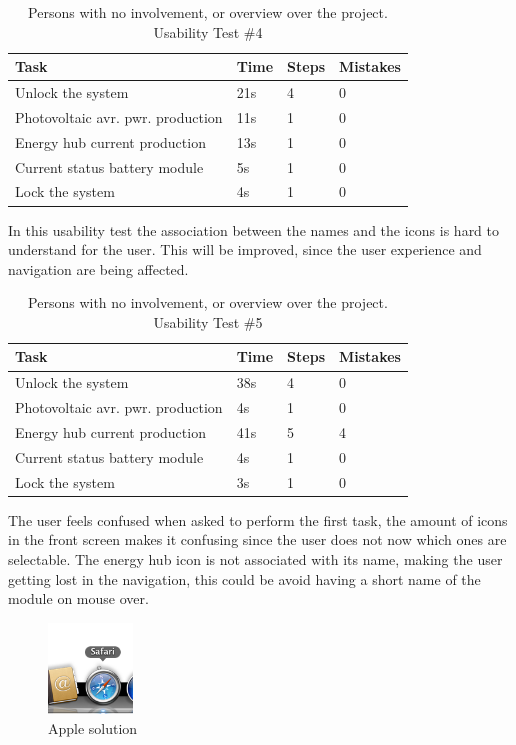 \begin{table}[H]
\begin{tabular}{ | l | l | l | l |}
	\hline
	Task 					     &		Time 	& 	Steps 	& 	Mistakes 		\\ \hline
	Unlock the system 			     & 		21s		& 	4		& 	0			\\ \hline
	Photovoltaic avr. pwr. production  & 		11s		&	1		& 	0			\\ \hline
	Energy hub current production      & 		13s		& 	1		& 	0			\\ \hline
	Current status battery module 	     & 		5s		& 	1		& 	0			\\ \hline
	Lock the system 			     & 		4s		& 	1		& 	0			\\ \hline
\end{tabular}
\caption{Persons with no involvement, or overview over the project.  Usability Test \#4}
\end{table}
In this usability test the association between the names and the icons is hard to understand for the user. This will be improved, since the user experience and navigation are being affected.\p

\begin{table}[H]
\begin{tabular}{ | l | l | l | l |}
	\hline
	Task 					      & 	Time 	& 	Steps 	& 	Mistakes 		\\ \hline
	Unlock the system 			      & 	38s		& 	4		& 	0			\\ \hline
	Photovoltaic avr. pwr. production   &		4s	    	& 	1		& 	0			\\ \hline
	Energy hub current production 	      & 	41s		& 	5 		& 	4 			\\ \hline
	Current status battery module 	      & 	4s		& 	1		& 	0			\\ \hline
	Lock the system 			      & 	3s		& 	1		& 	0			\\ \hline
\end{tabular}
\caption{Persons with no involvement, or overview over the project. Usability Test \#5}
\end{table}
The user feels confused when asked to perform the first task, the amount of icons in the front screen makes it confusing since the user does not now which ones are selectable. The energy hub icon is not associated with its name, making the user getting lost in the navigation, this could be avoid having a short name of the module on mouse over.

\begin{figure}[H]
	\center
		\includegraphics[width=0.2\textwidth]{images/legend.png}
   	\caption{Apple solution}
\end{figure}


